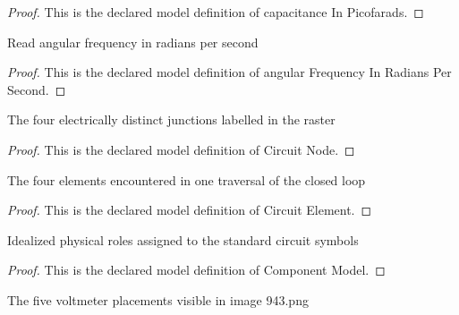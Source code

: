 \begin{proof}
  This is the declared model definition of capacitance In Picofarads.
\end{proof}
\begin{definition}
  \label{def:physics:phyx-mini-0943:phyxminiproblems-problemphyxmini0943-angularfrequencyinradianspersecond}
  Read angular frequency in radians per second
\end{definition}
\begin{proof}
  This is the declared model definition of angular Frequency In Radians Per Second.
\end{proof}
\begin{definition}
  \label{def:physics:phyx-mini-0943:phyxminiproblems-problemphyxmini0943-circuitnode}
  The four electrically distinct junctions labelled in the raster
\end{definition}
\begin{proof}
  This is the declared model definition of Circuit Node.
\end{proof}
\begin{definition}
  \label{def:physics:phyx-mini-0943:phyxminiproblems-problemphyxmini0943-circuitelement}
  The four elements encountered in one traversal of the closed loop
\end{definition}
\begin{proof}
  This is the declared model definition of Circuit Element.
\end{proof}
\begin{definition}
  \label{def:physics:phyx-mini-0943:phyxminiproblems-problemphyxmini0943-componentmodel}
  Idealized physical roles assigned to the standard circuit symbols
\end{definition}
\begin{proof}
  This is the declared model definition of Component Model.
\end{proof}
\begin{definition}
  \label{def:physics:phyx-mini-0943:phyxminiproblems-problemphyxmini0943-voltagemeterplacement}
  The five voltmeter placements visible in image 943.png
\end{definition}
